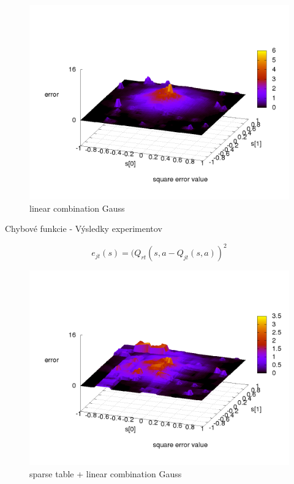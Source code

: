 \begin{figure}[!htb]
\centering
\includegraphics[scale=.2]{../../results_q_learning/map_1/function_type_2/q_learning_error.png}
\caption{linear combination Gauss}
\end{figure}



Chybové funkcie - Výsledky experimentov

\begin{equation}
e_{jt}(s) = (Q_{rt}(s,a - Q_{jt}(s,a))^2  \nonumber
\end{equation}

\begin{figure}[!htb]
\centering
\includegraphics[scale=.2]{../../results_q_learning/map_1/function_type_3/q_learning_error.png}
\caption{sparse table + linear combination Gauss}
\end{figure}



